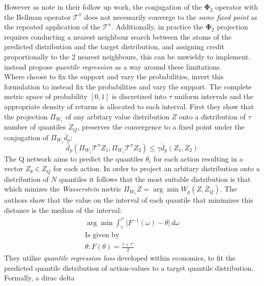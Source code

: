 However as \cite{Dabney2017} note in their follow up work, the conjugation of the $\mathbf{\Phi}_2$ operator with the Bellman operator $\mathcal{T}^\pi$
does not necessarily converge to the \emph{same fixed point} as the repeated application of the $\mathcal{T}^\pi$. Additionally, in practice
the $\mathbf{\Phi}_2$ projection requires conducting a nearest neighbour search between the atoms of the predicted distribution
and the target distribution, and assigning credit proportionally to the 2 nearest neighbours, this can be unwieldy to implement.
\cite{Dabney2017} instead propose \emph{quantile regression} as a way around these limitations.\\

Where \cite{Bellemare2017} choose to fix the support and vary the probabilities,\cite{Dabney2017} invert
this formulation to instead fix the probabilities and vary the support. The complete metric space of
probability $[0,1]$ is discretized into $\tau$ uniform intervals and the appropriate density of returns 
is allocated to each interval. First they show that the projection $\Pi_{W_1}$ of any arbitary value distribution
$Z$ onto a distribution of $\tau$ number of quantiles $Z_Q$, preserves the convergence to a fixed point under the conjugation
of $\Pi_{W_1} \bar{d}_p$:
\begin{equation}
    \bar{d}_p(\Pi_{W_1} \mathcal{T}^\pi Z_1,\Pi_{W_1} \mathcal{T}^\pi Z_2) \leqslant \gamma \bar{d}_p(Z_1, Z_2)
\end{equation}
The Q network aims to predict the quantiles $\theta_i$ for each action  resulting in a vector $Z_\theta \in Z_Q$
for each action. In order to project an arbitary distribution onto a distribution of $N$ quantiles
it follows that the most suitable distribution is that which minizes the \emph{Wasserstein} metric $\Pi_{W_1}Z= \arg \min W_p(Z, Z_Q)$. 
The authors show that the value on the interval of each quantile that minimizes this distance is the
median of the interval:
\begin{equation}
    \begin{gathered}
        \arg \min \int^{\tau'}_\tau \vert F^{-1}(\omega) - \theta \vert \, d\omega \\
        \text{Is given by} \\
        \theta : F(\theta) = \frac{\tau + \tau'}{2}
    \end{gathered}
\end{equation}
They utilise \emph{quantile regression loss} developed within economics, to fit the predicted
quantile distribution of action-values to a target quantile distribution. Formally, a dirac delta
